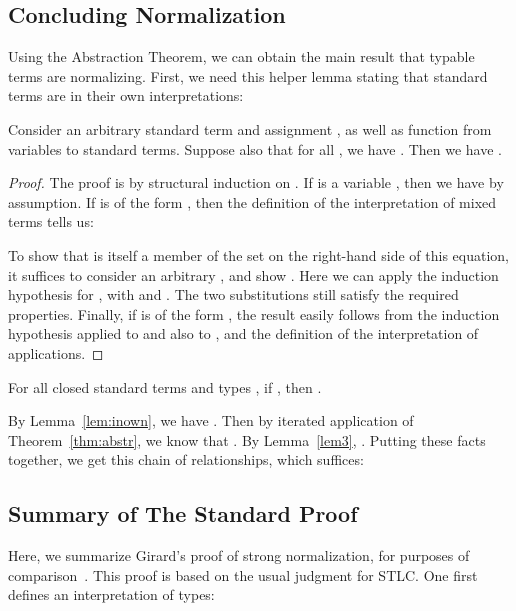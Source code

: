 \documentclass{LMCS}
\begin{document}
\subsection{Concluding Normalization}

Using the Abstraction Theorem, we can obtain the main result that
typable terms are normalizing.  First, we need this helper lemma
stating that standard terms are in their own interpretations:

\begin{lem}
\label{lem:inown}
Consider an arbitrary standard term  and assignment , as well
as function  from variables to standard terms.  Suppose also
that for all , we have .  Then
we have .
\end{lem}
\begin{proof}
The proof is by structural induction on .  If  is a
variable , then we have  by assumption.  If 
is of the form , then the definition of the
interpretation of mixed terms tells us:

\noindent To show that  is itself a member of the set
on the right-hand side of this equation, it suffices to consider an
arbitrary , and show .  Here we can apply the
induction hypothesis for , with  and
.  The two substitutions still satisfy the
required properties.  Finally, if  is of the form , the
result easily follows from the induction hypothesis applied to 
and also to , and the definition of the interpretation of
applications.
\end{proof}

\begin{thm}
For all closed standard terms  and types , if , then .
\end{thm}

\proof By Lemma~\ref{lem:inown}, we have
.  Then by iterated application of
Theorem~\ref{thm:abstr}, we know that
.  By
Lemma~\ref{lem3}, .
Putting these facts together, we get this chain of relationships,
which suffices:


\subsection{Summary of The Standard Proof}

\newcommand{\redd}[1]{\textit{Red}_{#1}}
\newcommand{\nxt}[0]{\textit{next}}
\newcommand{\sn}[0]{\textit{SN}}

Here, we summarize Girard's proof of strong normalization, for
purposes of comparison~\cite{girard-proofs-types}.  This proof is
based on the usual judgment  for STLC.  One first
defines an interpretation of types:
\end{document}
